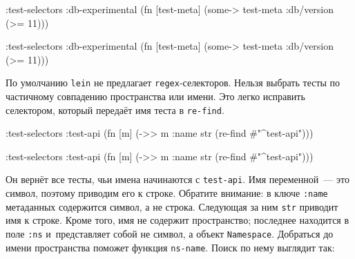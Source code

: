 \ifnarrow

\begin{english}
  \begin{clojure}
:test-selectors
  {:db-experimental
   (fn [test-meta]
     (some-> test-meta
             :db/version
             (>= 11)))}
  \end{clojure}
\end{english}

\else

\begin{english}
  \begin{clojure}
:test-selectors
  {:db-experimental
    (fn [test-meta]
      (some-> test-meta :db/version (>= 11)))}
  \end{clojure}
\end{english}

\fi

По умолчанию \verb|lein| не предлагает \verb|regex|-селекторов. Нельзя выбрать
тесты по частичному совпадению пространства или имени. Это легко исправить
селектором, который передаёт имя теста в \verb|re-find|.

\ifnarrow

\begin{english}
  \begin{clojure}
:test-selectors
  {:test-api
   (fn [m]
     (->> m :name str
          (re-find #"^test-api")))}
  \end{clojure}
\end{english}

\else

\begin{english}
  \begin{clojure}
:test-selectors
  {:test-api
    (fn [m] (->> m :name str
                 (re-find #"^test-api")))}
  \end{clojure}
\end{english}

\fi

Он вернёт все тесты, чьи имена начинаются с \verb|test-api|. Имя переменной~---
это символ, поэтому приводим его к строке. Обратите внимание: в ключе
\verb|:name| метаданных содержится символ, а не строка. Следующая за ним
\verb|str| приводит имя к строке. Кроме того, имя не содержит пространство;
последнее находится в поле \verb|:ns| и~представляет собой не символ, а объект
\verb|Namespace|. Добраться до имени пространства поможет функция
\verb|ns-name|. Поиск по нему выглядит так:


